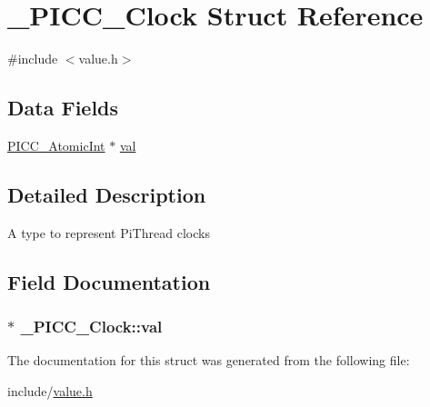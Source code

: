 \hypertarget{struct__PICC__Clock}{\section{\-\_\-\-P\-I\-C\-C\-\_\-\-Clock Struct Reference}
\label{struct__PICC__Clock}
}


{\ttfamily \#include $<$value.\-h$>$}

\subsection*{Data Fields}
{\bf }\par
\begin{DoxyCompactItemize}
\item 
\hyperlink{value_8h_afda5b8fd6b58b8a03e59d4bf1a4d3140}{P\-I\-C\-C\-\_\-\-Atomic\-Int} $\ast$ \hyperlink{struct__PICC__Clock_afd203d9fd4fda70fca2268b440998985}{val}
\end{DoxyCompactItemize}



\subsection{Detailed Description}
A type to represent Pi\-Thread clocks 

\subsection{Field Documentation}
\hypertarget{struct__PICC__Clock_afd203d9fd4fda70fca2268b440998985}{
\subsubsection[{val}]{$\ast$ \-\_\-\-P\-I\-C\-C\-\_\-\-Clock\-::val}}\label{struct__PICC__Clock_afd203d9fd4fda70fca2268b440998985}


The documentation for this struct was generated from the following file\-:\begin{DoxyCompactItemize}
\item 
include/\hyperlink{value_8h}{value.\-h}\end{DoxyCompactItemize}
